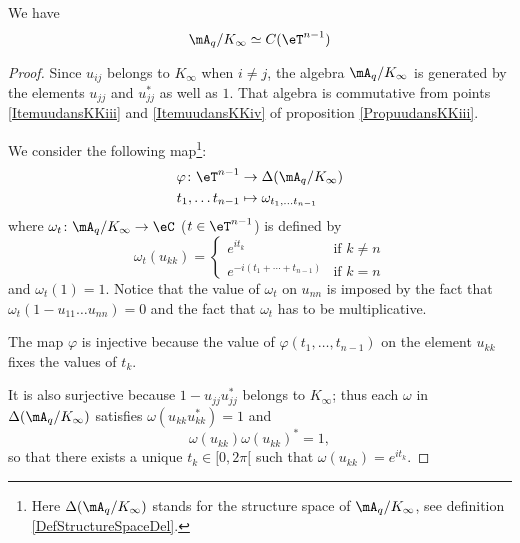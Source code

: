 \begin{proposition}
    We have
    \begin{equation}
        \mA_q/K_{\infty}\simeq C(\eT^{n-1})
    \end{equation}
    
\end{proposition}

\begin{proof}
    Since $u_{ij}$ belongs to $K_{\infty}$ when $i\neq j$, the algebra $\mA_q/K_{\infty}$ is generated by the elements $u_{jj}$ and $u_{jj}^*$ as well as $1$. That algebra is commutative from points \ref{ItemuudansKKiii} and \ref{ItemuudansKKiv} of proposition \ref{PropuudansKKiii}.

    We consider the following map\footnote{Here $\Delta(\mA_q/K_{\infty})$ stands for the structure space of $\mA_q/K_{\infty}$, see definition \ref{DefStructureSpaceDel}.}:
    \begin{equation}
        \begin{aligned}
            \varphi\colon \eT^{n-1}&\to \Delta(\mA_q/K_{\infty}) \\
            t_1,\ldots t_{n-1}&\mapsto \omega_{t_1,\ldots t_{n-1}} 
        \end{aligned}
    \end{equation}
    where $\omega_t\colon \mA_q/K_{\infty}\to \eC$ ($t\in\eT^{n-1}$) is defined by
    \begin{equation}
        \omega_t(u_{kk})=\begin{cases}
            e^{it_k}    &   \text{if }k\neq n\\
            e^{-i(t_1+\cdots+t_{n-1})}  &    \text{if }k=n
        \end{cases}
    \end{equation}
    and $\omega_t(1)=1$. Notice that the value of $\omega_t$ on $u_{nn}$ is imposed by the fact that $\omega_t(1-u_{11}\ldots u_{nn})=0$ and the fact that $\omega_t$ has to be multiplicative.

    The map $\varphi$ is injective because the value of $\varphi(t_1,\ldots,t_{n-1})$ on the element $u_{kk}$ fixes the values of $t_k$.

    It is also surjective because $1-u_{jj}u_{jj}^*$ belongs to $K_{\infty}$; thus each $\omega$ in $\Delta(\mA_q/K_{\infty})$ satisfies $\omega(u_{kk}u_{kk}^*)=1$ and
    \begin{equation}
        \omega(u_{kk})\omega(u_{kk})^*=1,
    \end{equation}
    so that there exists a unique $t_k\in\mathopen[ 0 , 2\pi [$ such that $\omega(u_{kk})= e^{it_k}$.


\end{proof}
